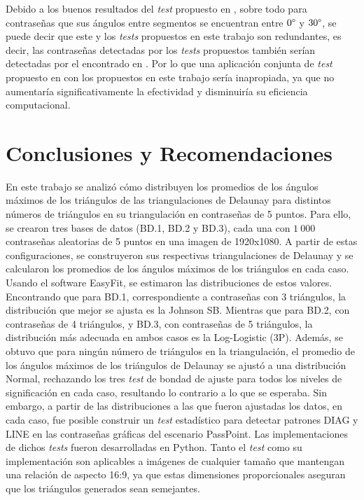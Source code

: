 \documentclass[12pt]{report}
\begin{document}
Debido a los buenos resultados del \textit{test} propuesto en \cite{13}, sobre todo para contraseñas que sus ángulos entre segmentos se encuentran entre $0\degree$ y $30\degree$, se puede decir que este y los \textit{tests} propuestos en este trabajo son redundantes, es decir, las contraseñas detectadas por los\textit{ tests} propuestos también serían detectadas por el encontrado en \cite{13}. Por lo que una aplicación conjunta de \textit{test} propuesto en \cite{13} con los propuestos en este trabajo sería inapropiada, ya que no aumentaría significativamente la efectividad y disminuiría su eficiencia computacional.

\chapter*{Conclusiones y Recomendaciones }
En este trabajo se analizó cómo distribuyen los promedios de los ángulos máximos de los triángulos de las triangulaciones de Delaunay para distintos números de triángulos en su triangulación en contraseñas de 5 puntos. Para ello, se crearon tres bases de datos (BD.1, BD.2 y BD.3), cada una con $1\ 000$ contraseñas aleatorias de 5 puntos en una imagen de 1920x1080. A partir de estas configuraciones, se construyeron sus respectivas triangulaciones de Delaunay y se calcularon los promedios de los ángulos máximos de los triángulos en cada caso. Usando el software EasyFit, se estimaron las distribuciones de estos valores. Encontrando que para BD.1, correspondiente a contraseñas con 3 triángulos, la distribución que mejor se ajusta es la Johnson SB. Mientras que para BD.2, con contraseñas de 4 triángulos, y BD.3, con contraseñas de 5 triángulos, la distribución más adecuada en ambos casos es la Log-Logistic (3P). Además, se obtuvo que para ningún número de  triángulos en la triangulación, el promedio de los ángulos máximos de los triángulos de Delaunay  se ajustó a una distribución Normal, rechazando los tres \textit{test} de bondad de ajuste para todos los niveles de significación en cada caso, resultando lo contrario a lo que se esperaba. Sin embargo, a partir de las distribuciones a las que fueron ajustadas los datos, en cada caso, fue posible construir un \textit{test} estadístico para detectar patrones DIAG y LINE en las contraseñas gráficas del escenario PassPoint. Las implementaciones de dichos \textit{tests} fueron desarrolladas en Python. Tanto el \textit{test} como su implementación son aplicables a imágenes de cualquier tamaño que mantengan una relación de aspecto 16:9, ya que estas dimensiones proporcionales aseguran que los triángulos generados sean semejantes. 
\end{document}
